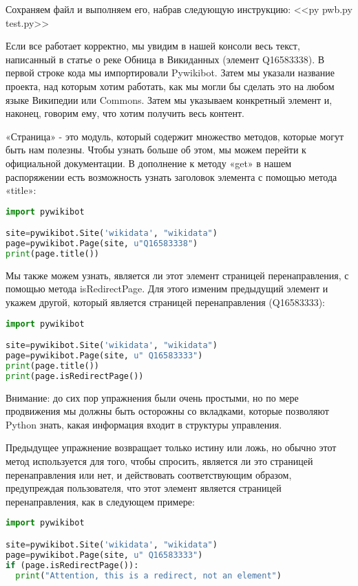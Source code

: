 Сохраняем файл и выполняем его, набрав следующую инструкцию: <<py pwb.py test.py>>

Если все работает корректно, мы увидим в нашей консоли весь текст, написанный в статье о реке Обница в Викиданных (элемент Q16583338). В первой строке кода мы импортировали Pywikibot. Затем мы указали название проекта, над которым хотим работать, как мы могли бы сделать это на любом языке Википедии или Commons. Затем мы указываем конкретный элемент и, наконец, говорим ему, что хотим получить весь контент.

«Страница» - это модуль, который содержит множество методов, которые могут быть нам полезны. Чтобы узнать больше об этом, мы можем перейти к официальной документации. В дополнение к методу «get» в нашем распоряжении есть возможность узнать заголовок элемента с помощью метода «title»:

\begin{lstlisting}[language=Python]
import pywikibot

site=pywikibot.Site('wikidata', "wikidata")
page=pywikibot.Page(site, u"Q16583338")
print(page.title())
\end{lstlisting}

Мы также можем узнать, является ли этот элемент страницей перенаправления, с помощью метода isRedirectPage. Для этого изменим предыдущий элемент и укажем другой, который является страницей перенаправления (Q16583333):

\begin{lstlisting}[language=Python]
import pywikibot

site=pywikibot.Site('wikidata', "wikidata")
page=pywikibot.Page(site, u" Q16583333")
print(page.title())
print(page.isRedirectPage())
\end{lstlisting}

Внимание: до сих пор упражнения были очень простыми, но по мере продвижения мы должны быть осторожны со вкладками, которые позволяют Python знать, какая информация входит в структуры управления.

Предыдущее упражнение возвращает только истину или ложь, но обычно этот метод используется для того, чтобы спросить, является ли это страницей перенаправления или нет, и действовать соответствующим образом, предупреждая пользователя, что этот элемент является страницей перенаправления, как в следующем примере:

\begin{lstlisting}[language=Python]
import pywikibot

site=pywikibot.Site('wikidata', "wikidata")
page=pywikibot.Page(site, u" Q16583333")
if (page.isRedirectPage()):
  print("Attention, this is a redirect, not an element")
\end{lstlisting}


